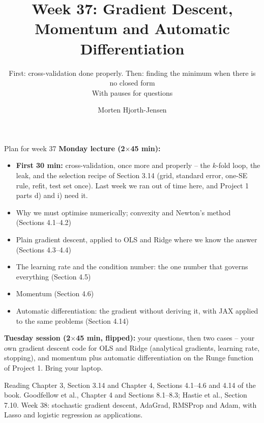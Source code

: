 \documentclass[10pt,aspectratio=169]{beamer}
\title{Week 37: Gradient Descent, Momentum and Automatic Differentiation}
\subtitle{First: cross-validation done properly.  Then: finding the minimum
  when there is no closed form\\[3pt]
  \small With pauses for questions}
\author{Morten Hjorth-Jensen}
\institute{Department of Physics and Center for Computing in Science Education,\\
  University of Oslo, Norway}
\date{}
\begin{document}
\begin{frame}
\titlepage
\end{frame}

\begin{frame}{Plan for week 37}
\small
\textbf{Monday lecture (2$\times$45 min):}
\begin{itemize}
  \item \textbf{First 30 min:} cross-validation, once more and properly --
        the $k$-fold loop, the leak, and the selection recipe of Section 3.14
        (grid, standard error, one-SE rule, refit, test set once).  Last week
        we ran out of time here, and Project 1 parts d) and i) need it.
  \item Why we must optimise numerically; convexity and Newton's method
        (Sections 4.1--4.2)
  \item Plain gradient descent, applied to OLS and Ridge where we know the
        answer (Sections 4.3--4.4)
  \item The learning rate and the condition number: the one number that
        governs everything (Section 4.5)
  \item Momentum (Section 4.6)
  \item Automatic differentiation: the gradient without deriving it, with
        JAX applied to the same problems (Section 4.14)
\end{itemize}
\vspace{3pt}
\textbf{Tuesday session (2$\times$45 min, flipped):} your questions, then two
cases -- your own gradient descent code for OLS and Ridge (analytical
gradients, learning rate, stopping), and momentum plus automatic
differentiation on the Runge function of Project 1.  Bring your laptop.
\vspace{3pt}
\begin{block}{Reading}
Chapter 3, Section 3.14 and Chapter 4, Sections 4.1--4.6 and 4.14 of the book.
Goodfellow et al., Chapter 4 and Sections 8.1--8.3; Hastie et al., Section 7.10.
Week 38: stochastic gradient descent, AdaGrad, RMSProp and Adam, with Lasso
and logistic regression as applications.
\end{block}
\end{frame}

\end{document}

